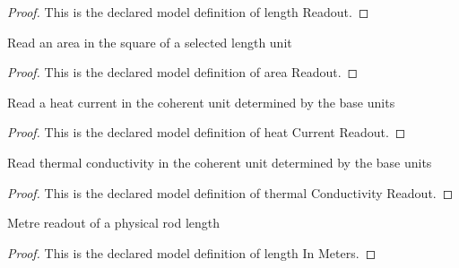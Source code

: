 \begin{proof}
  This is the declared model definition of length Readout.
\end{proof}
\begin{definition}
  \label{def:physics:phyx-mini-0488:phyxminiproblems-problemphyxmini0488-areareadout}
  Read an area in the square of a selected length unit
\end{definition}
\begin{proof}
  This is the declared model definition of area Readout.
\end{proof}
\begin{definition}
  \label{def:physics:phyx-mini-0488:phyxminiproblems-problemphyxmini0488-heatcurrentreadout}
  Read a heat current in the coherent unit determined by the base units
\end{definition}
\begin{proof}
  This is the declared model definition of heat Current Readout.
\end{proof}
\begin{definition}
  \label{def:physics:phyx-mini-0488:phyxminiproblems-problemphyxmini0488-thermalconductivityreadout}
  Read thermal conductivity in the coherent unit determined by the base units
\end{definition}
\begin{proof}
  This is the declared model definition of thermal Conductivity Readout.
\end{proof}
\begin{definition}
  \label{def:physics:phyx-mini-0488:phyxminiproblems-problemphyxmini0488-lengthinmeters}
  Metre readout of a physical rod length
\end{definition}
\begin{proof}
  This is the declared model definition of length In Meters.
\end{proof}
